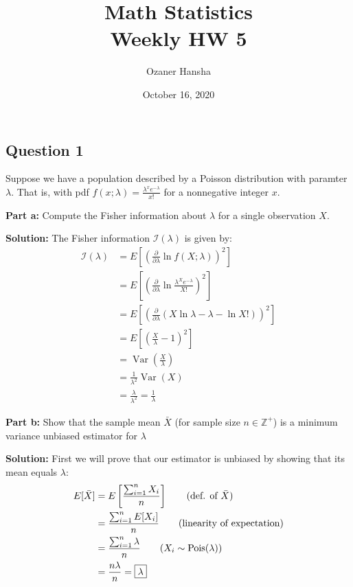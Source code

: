 \documentclass{article}
\DeclareMathOperator{\Var}{Var}
\begin{document}
\title{Math Statistics\\ Weekly HW 5}
\author{Ozaner Hansha}
\date{October 16, 2020}
\maketitle

\subsection*{Question 1}
Suppose we have a population described by a Poisson distribution with paramter $\lambda$. That is, with pdf $f(x;\lambda)=\frac{\lambda^xe^{-\lambda}}{x!}$ for a nonnegative integer $x$.
\bigskip

\noindent\textbf{Part a:} Compute the Fisher information about $\lambda$ for a single observation $X$.
\bigskip

\noindent\textbf{Solution:} The Fisher information $\mathcal I(\lambda)$ is given by:
\begin{align*}
  \mathcal I(\lambda)&=E\left[\left(\frac{\partial}{\partial\lambda}\ln f(X;\lambda)\right)^2\right]\tag{def. of Fisher information}\\
  &=E\left[\left(\frac{\partial}{\partial\lambda}\ln \frac{\lambda^Xe^{-\lambda}}{X!}\right)^2\right]\\
  &=E\left[\left(\frac{\partial}{\partial\lambda}\left(X\ln\lambda-\lambda-\ln X!\right)\right)^2\right]\\
  &=E\left[\left(\frac{X}{\lambda}-1\right)^2\right]\\
  &=\Var\left(\frac{X}{\lambda}\right)\tag{def. of variance ($E[X/\mu_X]=1$)}\\
  &=\frac{1}{\lambda^2}\Var(X)\\
  &=\frac{\lambda}{\lambda^2}=\boxed{\frac{1}{\lambda}}
\end{align*}
\smallskip

\noindent\textbf{Part b:} Show that the sample mean $\bar{X}$ (for sample size $n\in\mathbb Z^+$) is a minimum variance unbiased estimator for $\lambda$
\bigskip

\noindent\textbf{Solution:} First we will prove that our estimator is unbiased by showing that its mean equals $\lambda$:
\begin{align*}
  E[\bar{X}]&=E\left[\frac{\sum_{i=1}^nX_i}{n}\right]\tag{def. of $\bar{X}$}\\
  &=\frac{\sum_{i=1}^nE[X_i]}{n}\tag{linearity of expectation}\\
  &=\frac{\sum_{i=1}^n\lambda}{n}\tag{$X_i\sim\operatorname{Pois}(\lambda)$}\\
  &=\frac{n\lambda}{n}=\boxed{\lambda}
\end{align*}
\newpage
\end{document}
